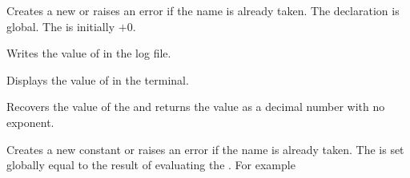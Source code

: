 \documentclass[oneside]{book}
\begin{document}
\begin{function}{\FpNew}
\begin{syntax}
 
\end{syntax}
Creates a new  or raises an error if the name is
already taken. The declaration is global. The  is
initially $+0$.
\end{function}

\begin{function}{\FpLogVar}
\begin{syntax}
 
\end{syntax}
Writes the value of  in the log file.
\end{function}

\begin{function}{\FpShowVar}
\begin{syntax}
 
\end{syntax}
Displays the value of  in the terminal.
\end{function}

\begin{function}{\FpUse}
\begin{syntax}
 
\end{syntax}
Recovers the value of the  and returns the value as a
decimal number with no exponent.
\end{function}

\begin{function}{\FpConst}
\begin{syntax}
  
\end{syntax}
Creates a new constant  or raises an error if the name
is already taken. The  is set globally equal to
the result of evaluating the .
For example
\begin{demohigh}
\FpConst{}
\FpUse\cMyPiFp
\end{demohigh}
\end{function}
\end{document}
